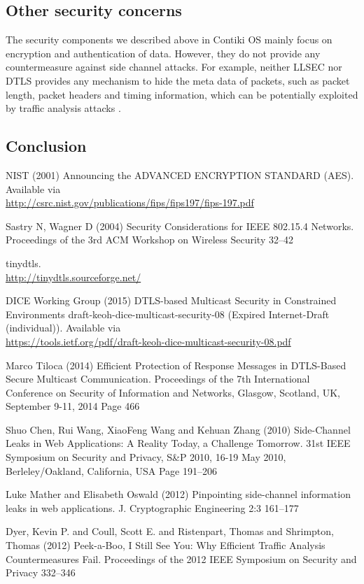 \subsection{Other security concerns}
The security components we described above in Contiki OS mainly focus on encryption and authentication of data. However, they do not provide any countermeasure against side channel attacks. For example, neither LLSEC nor DTLS provides any mechanism to hide the meta data of packets, such as packet length, packet headers and timing information, which can be potentially exploited by traffic analysis attacks\cite{ta1} \cite{ta2} \cite{ta3}. 

\subsection{Conclusion}

\begin{thebibliography}{99.}
 NIST (2001) Announcing the ADVANCED ENCRYPTION STANDARD (AES). Available via\\
\url{http://csrc.nist.gov/publications/fips/fips197/fips-197.pdf}

 Sastry N, Wagner D (2004) Security Considerations for IEEE 802.15.4 Networks. Proceedings of the 3rd ACM Workshop on Wireless Security 32--42

 tinydtls. \\ 
\url{http://tinydtls.sourceforge.net/}

 DICE Working Group (2015) DTLS-based Multicast Security in Constrained Environments
 draft-keoh-dice-multicast-security-08 (Expired Internet-Draft (individual)). Available via\\
\url{https://tools.ietf.org/pdf/draft-keoh-dice-multicast-security-08.pdf}

 Marco Tiloca (2014) Efficient Protection of Response Messages in DTLS-Based Secure Multicast Communication. Proceedings of the 7th International Conference on Security of Information and Networks, Glasgow, Scotland, UK, September 9-11, 2014 Page 466

 Shuo Chen, Rui Wang, XiaoFeng Wang and Kehuan Zhang (2010) Side-Channel Leaks in Web Applications: {A} Reality Today, a Challenge Tomorrow. 31st {IEEE} Symposium on Security and Privacy, S{\&}P 2010, 16-19 May 2010, Berleley/Oakland, California, {USA} Page 191--206

 Luke Mather and Elisabeth Oswald (2012) Pinpointing side-channel information leaks in web applications. J. Cryptographic Engineering 2:3 161--177

 Dyer, Kevin P. and Coull, Scott E. and Ristenpart, Thomas and Shrimpton, Thomas (2012) Peek-a-Boo, I Still See You: Why Efficient Traffic Analysis Countermeasures Fail. Proceedings of the 2012 IEEE Symposium on Security and Privacy 332--346
\end{thebibliography}